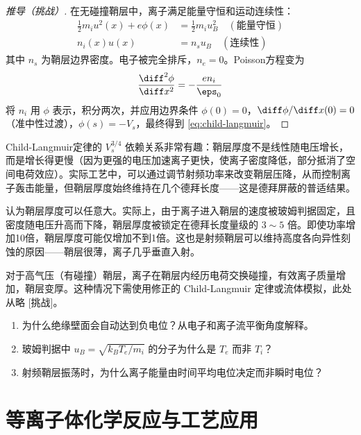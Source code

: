 \begin{proof}[推导（挑战）]
在无碰撞鞘层中，离子满足能量守恒和运动连续性：
\begin{align}
\frac{1}{2}m_i u^2(x) + e\phi(x) &= \frac{1}{2}m_i u_B^2 \quad (\text{能量守恒}) \\
n_i(x) u(x) &= n_s u_B \quad (\text{连续性})
\end{align}
其中 $n_s$ 为鞘层边界密度。电子被完全排斥，$n_e = 0$。Poisson方程变为
\begin{equation}
\frac{\diff^2\phi}{\diff x^2} = -\frac{e n_i}{\eps_0}
\end{equation}
将 $n_i$ 用 $\phi$ 表示，积分两次，并应用边界条件 $\phi(0)=0$，$\diff\phi/\diff x(0)=0$（准中性过渡），$\phi(s)=-V_s$，最终得到 \cref{eq:child-langmuir}。
\end{proof}

\begin{insight}{}{}
Child-Langmuir定律的 $V_s^{3/4}$ 依赖关系非常有趣：鞘层厚度不是线性随电压增长，而是增长得更慢（因为更强的电压加速离子更快，使离子密度降低，部分抵消了空间电荷效应）。实际工艺中，可以通过调节射频功率来改变鞘层压降，从而控制离子轰击能量，但鞘层厚度始终维持在几个德拜长度——这是德拜屏蔽的普适结果。
\end{insight}

\begin{warning}{}{}
认为鞘层厚度可以任意大。实际上，由于离子进入鞘层的速度被玻姆判据固定，且密度随电压升高而下降，鞘层厚度被锁定在德拜长度量级的 $3\sim 5$ 倍。即使功率增加10倍，鞘层厚度可能仅增加不到1倍。这也是射频鞘层可以维持高度各向异性刻蚀的原因——鞘层很薄，离子几乎垂直入射。
\end{warning}

对于高气压（有碰撞）鞘层，离子在鞘层内经历电荷交换碰撞，有效离子质量增加，鞘层变厚。这种情况下需使用修正的 Child-Langmuir 定律或流体模拟，此处从略 [挑战]。

\begin{miniquiz}
\begin{enumerate}
\item 为什么绝缘壁面会自动达到负电位？从电子和离子流平衡角度解释。
\item 玻姆判据中 $u_B = \sqrt{k_B T_e/m_i}$ 的分子为什么是 $T_e$ 而非 $T_i$？
\item 射频鞘层振荡时，为什么离子能量由时间平均电位决定而非瞬时电位？
\end{enumerate}
\end{miniquiz}

\section{等离子体化学反应与工艺应用}

